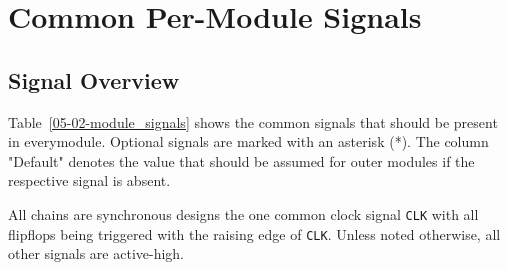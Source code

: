 


\section{Common Per-Module Signals} \label{ch:05-02-interfaces-module_signals}


\subsection{Signal Overview}

Table~\ref{05-02-module_signals} shows the common signals that should be present in every\asterics module. Optional signals are marked with an asterisk (*). The column "Default" denotes the value that should be assumed for outer modules if the respective signal is absent.

All \asterics chains are synchronous designs the one common clock signal \texttt{CLK} with all flipflops being triggered with the raising edge of \texttt{CLK}. Unless noted otherwise, all other signals are active-high.

